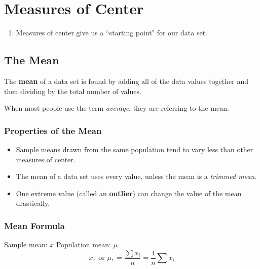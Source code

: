 \documentclass{article}
\begin{document}
\section*{Measures of Center}

\begin{tcolorbox}[colframe=orange!70!white, coltitle=black, title=\textbf{Summary}]
\begin{enumerate}
    \item Measures of center give us a ``starting point" for our data set.
\end{enumerate}
\end{tcolorbox}
\vspace{0.75in}


\subsection*{The Mean}
\begin{tcolorbox}[colframe=green!20!black, colback = green!30!white,title=\textbf{Mean}]
The \textbf{mean} of a data set is found by adding all of the data values together and then dividing by the total number of values. 
\end{tcolorbox}
\vspace{11pt}	

When most people use the term \textit{average}, they are referring to the mean.


\subsubsection*{Properties of the Mean}
\begin{itemize}
	\item Sample means drawn from the same population tend to vary less than other measures of center.	
	\item The mean of a data set uses every value, unless the mean is a \textit{trimmed mean}.	
	\item One extreme value (called an {\color{blue}\textbf{outlier}}) can change the value of the mean drastically.
\end{itemize}
\vspace{0.5in}

\subsubsection*{Mean Formula}
Sample mean: $\overline{x}$	\qquad	Population mean: $\mu$	\newline\\	
\[ \overline{x}, \text{ or } \mu, = \frac{\sum x_i}{n} = \frac{1}{n}\sum x_i	\]
\end{document}
